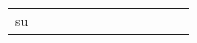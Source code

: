 \documentclass[conference]{IEEEtran}
\begin{document}
\begin{figure}
\begin{center}
\begin{tabular}{| x{1.11cm} | x{.75cm} | x{.75cm} || x{1.11cm} | x{.75cm} | x{.75cm} || x{1.11cm} | x{.75cm} | x{.75cm} || x{1.11cm} | x{.75cm} | x{.75cm} |}
su
\end{tabular}
\end{center}
\end{figure}
\end{document}
